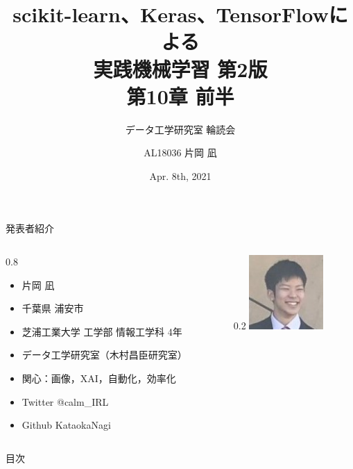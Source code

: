\documentclass[aspectratio=169, dvipdfmx, 14pt, xcolor={svgnames,dvipsnames}]{beamer}
\title[実践機械学習 輪読会 第10章 前半]{scikit-learn、Keras、TensorFlowによる\\実践機械学習 第2版\\第10章 前半}
\subtitle{データ工学研究室 輪読会}
\author[片岡 凪]{AL18036 片岡 凪}
\institute[データ工学研究室 B4]{芝浦工業大学 工学部 情報工学科 4年}
\date{Apr. 8th, 2021}
\newlength{\mytotalwidth}
\newlength{\mycolumnwidth}
\begin{document}

\maketitle


\begin{frame}{\quad 発表者紹介}
  \begin{columns}[totalwidth=\mytotalwidth]
    \begin{column}[t]{0.8\mycolumnwidth}
      \begin{itemize}
        \item 片岡 凪
        \item 千葉県 浦安市
        \item 芝浦工業大学 工学部 情報工学科 4年
        \item データ工学研究室（木村昌臣研究室）
        \item 関心：画像，XAI，自動化，効率化
        \item Twitter @calm\_IRL
        \item Github  KataokaNagi
      \end{itemize}
    \end{column}
    \begin{column}[T]{0.2\mycolumnwidth}
      \centering
      \includegraphics[width=80pt]{img/icon.jpg}
    \end{column}
  \end{columns}
\end{frame}


\begin{frame}{\quad 目次}
  \tableofcontents
\end{frame}

\end{document}
